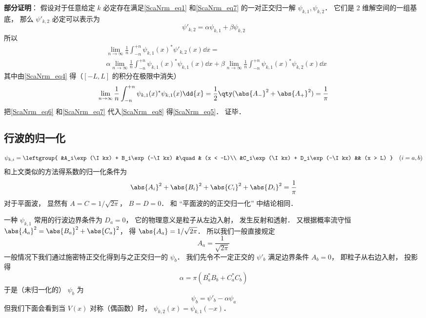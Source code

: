 \textbf{部分证明}： 假设对于任意给定 $k$ 必定存在满足\autoref{ScaNrm_eq1} 和\autoref{ScaNrm_eq7} 的一对正交归一解 $\psi_{k,1}, \psi_{k,2}$． 它们是 2 维解空间的一组基底， 那么 $\psi'_{k,2}$ 必定可以表示为
\begin{equation}
\psi'_{k,2} = \alpha\psi_{k,1} + \beta\psi_{k,2}
\end{equation}
所以
\begin{equation}\label{ScaNrm_eq8}
\begin{aligned}
&\lim_{n\to\infty}\frac{1}{n}\int_{-n}^{+n} \psi_{k,1}(x)^*\psi'_{k,2}(x)\dd{x}
=\\
&\alpha\lim_{n\to\infty}\frac{1}{n}\int_{-n}^{+n} \psi_{k,1}(x)^*\psi_{k,1}(x)\dd{x}
+ \beta\lim_{n\to\infty}\frac{1}{n}\int_{-n}^{+n} \psi_{k,1}(x)^*\psi_{k,2}(x)\dd{x}
\end{aligned}
\end{equation}
其中由\autoref{ScaNrm_eq4} 得（$[-L,L]$ 的积分在极限中消失）
\begin{equation}\label{ScaNrm_eq6}
\lim_{n\to\infty}\frac{1}{n}\int_{-n}^{+n} \psi_{k,1}(x)^*\psi_{k,1}(x)\dd{x} = \frac{1}{2}\qty(\abs{A_-}^2 + \abs{A_+}^2) = \frac{1}{\pi}
\end{equation}
把\autoref{ScaNrm_eq6} 和\autoref{ScaNrm_eq7} 代入\autoref{ScaNrm_eq8} 得\autoref{ScaNrm_eq5}． 证毕．

\subsection{行波的归一化}

\begin{equation}
\psi_{k,i} = \leftgroup{
    &A_i\exp(\I kx) + B_i\exp(-\I kx) &\quad& (x < -L)\\
    &C_i\exp(\I kx) + D_i\exp(-\I kx) && (x > L)
} \quad (i = a,b)
\end{equation}
和上文类似的方法得系数的归一化条件为
\begin{equation}
\abs{A_i}^2 + \abs{B_i}^2 + \abs{C_i}^2 + \abs{D_i}^2= \frac{1}{\pi}
\end{equation}
对于平面波， 显然有 $A = C = 1/\sqrt{2\pi}$， $B = D = 0$． 和 “平面波的的正交归一化” 中结论相同．

一种 $\psi_{k,1}$ 常用的行波边界条件为 $D_a = 0$， 它的物理意义是粒子从左边入射， 发生反射和透射． 又根据概率流守恒 $\abs{A_a}^2 = \abs{B_a}^2 + \abs{C_a}^2$， 得 $\abs{A_a} = 1/\sqrt{2\pi}$． 所以我们一般直接规定
\begin{equation}\label{ScaNrm_eq10}
A_a = \frac{1}{\sqrt{2\pi}}
\end{equation}
一般情况下我们通过施密特正交化得到与之正交归一的 $\psi_b$． 我们先令不一定正交的 $\psi'_b$ 满足边界条件 $A_b = 0$， 即粒子从右边入射， 投影得
\begin{equation}
\alpha = \pi (B_a^* B_b + C_a^*C_b)
\end{equation}
于是（未归一化的） $\psi_b$ 为
\begin{equation}
\psi_b = \psi'_b - \alpha \psi_a
\end{equation}
但我们下面会看到当 $V(x)$ 对称（偶函数）时， $\psi_{k,2}(x) = \psi_{k,1}(-x)$．

